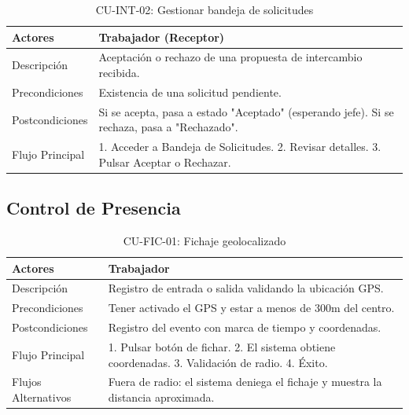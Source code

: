 \begin{table}[H]
\caption{CU-INT-02: Gestionar bandeja de solicitudes}\label{tab:cu-inbox}
\begin{center}
    \begin{tabular}{|l|p{11cm}|}
    \hline
    Actores & Trabajador (Receptor) \\ \hline
    Descripción & Aceptación o rechazo de una propuesta de intercambio recibida. \\ \hline
    Precondiciones & Existencia de una solicitud pendiente. \\ \hline
    Postcondiciones & Si se acepta, pasa a estado "Aceptado" (esperando jefe). Si se rechaza, pasa a "Rechazado". \\ \hline
    Flujo Principal & 1. Acceder a Bandeja de Solicitudes. 2. Revisar detalles. 3. Pulsar Aceptar o Rechazar. \\ \hline
    \end{tabular}
\end{center}
\end{table}

\subsection{Control de Presencia}

\begin{table}[H]
\caption{CU-FIC-01: Fichaje geolocalizado}\label{tab:cu-fichaje}
\begin{center}
    \begin{tabular}{|l|p{11cm}|}
    \hline
    Actores & Trabajador \\ \hline
    Descripción & Registro de entrada o salida validando la ubicación GPS. \\ \hline
    Precondiciones & Tener activado el GPS y estar a menos de 300m del centro. \\ \hline
    Postcondiciones & Registro del evento con marca de tiempo y coordenadas. \\ \hline
    Flujo Principal & 1. Pulsar botón de fichar. 2. El sistema obtiene coordenadas. 3. Validación de radio. 4. Éxito. \\ \hline
    Flujos Alternativos & Fuera de radio: el sistema deniega el fichaje y muestra la distancia aproximada. \\ \hline
    \end{tabular}
\end{center}
\end{table}

